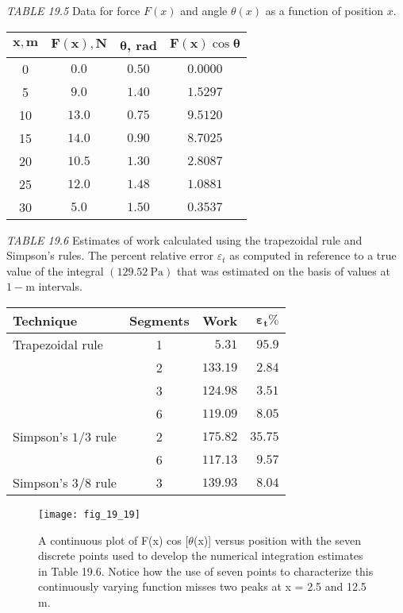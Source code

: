 \documentclass[../main.tex]{subfiles}
\begin{document}
\textit{TABLE 19.5} Data for force $F(x)$ and angle $\theta(x)$ as a function of position $x$.
\begin{center}
\begin{tabular}{cccc}
\hline $\boldsymbol{x}, \mathbf{m}$ & $\boldsymbol{F}(\boldsymbol{x}), \mathbf{N}$ & $\boldsymbol{\theta}$, rad & $\boldsymbol{F}(\boldsymbol{x}) \cos \boldsymbol{\theta}$ \\
\hline 0 & $0.0$ & $0.50$ & $0.0000$ \\
5 & $9.0$ & $1.40$ & $1.5297$ \\
10 & $13.0$ & $0.75$ & $9.5120$ \\
15 & $14.0$ & $0.90$ & $8.7025$ \\
20 & $10.5$ & $1.30$ & $2.8087$ \\
25 & $12.0$ & $1.48$ & $1.0881$ \\
30 & $5.0$ & $1.50$ & $0.3537$ \\
\hline
\end{tabular}
\end{center}

\textit{TABLE 19.6} Estimates of work calculated using the trapezoidal rule and Simpson's rules. The percent relative error $\varepsilon_{t}$ as computed in reference to a true value of the integral $(129.52 \mathrm{~Pa})$ that was estimated on the basis of values at $1-\mathrm{m}$ intervals.

\begin{center}
\begin{tabular}{lcrr}
\hline Technique & Segments & Work & $\boldsymbol{\varepsilon}_{\boldsymbol{t}}\%{}$ \\
\hline Trapezoidal rule & 1 & $5.31$ & $95.9$ \\
& 2 & $133.19$ & $2.84$ \\
& 3 & $124.98$ & $3.51$ \\
& 6 & $119.09$ & $8.05$ \\
Simpson's $1 / 3$ rule & 2 & $175.82$ & $35.75$ \\
& 6 & $117.13$ & $9.57$ \\
Simpson's $3 / 8$ rule & 3 & $139.93$ & $8.04$ \\
\hline
\end{tabular}
\end{center}

\begin{figure}[H]
    \centering
    \texttt{[image: fig\_19\_19]}
   \caption{\textsf{A continuous plot of F(x) cos [$\theta$(x)] versus position with the seven discrete points used to develop
   the numerical integration estimates in Table 19.6. Notice how the use of seven points to
   characterize this continuously varying function misses two peaks at x = 2.5 and 12.5 m.}}\label{fig:fig_19_19}
\end{figure}
\end{document}

